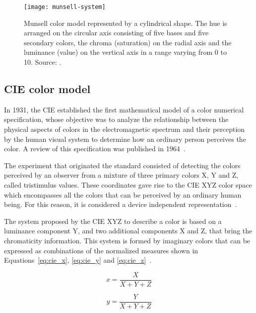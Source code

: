 \begin{figure}[!ht]
  \centering
  \texttt{[image: munsell-system]}
  \caption[Munsell color model.]{Munsell color model represented by a cylindrical shape. The hue is arranged on the circular axis consisting of five bases and five secondary colors, the chroma (saturation) on the radial axis and the luminance (value) on the vertical axis in a range varying from 0 to 10. Source: \citet{rus:07}.}
  \label{fig:munsell-system} 
\end{figure}

\subsection{CIE color model}
\label{sec:modelo_cores_cie}

In 1931, the CIE established the first mathematical model of a color numerical specification, whose objective was to analyze the relationship between the physical aspects of colors in the electromagnetic spectrum and their perception by the human visual system to determine how an ordinary person perceives the color. A review of this specification was published in 1964~\citep{gonzalez:02}.

The experiment that originated the standard consisted of detecting the colors perceived by an observer from a mixture of three primary colors X, Y and Z, called tristimulus values. These coordinates gave rise to the CIE XYZ color space which encompasses all the colors that can be perceived by an ordinary human being. For this reason, it is considered a device independent representation~\citep{konstantinos:00}.

The system proposed by the CIE XYZ to describe a color is based on a luminance component Y, and two additional components X and Z, that bring the chromaticity information. This system is formed by imaginary colors that can be expressed as combinations of the normalized measures shown in Equations~\ref{eq:cie_x}, \ref{eq:cie_y} and \ref{eq:cie_z}~\citep{konstantinos:00}.

\newpage
\begin{equation}
  x = \frac{X}{X + Y + Z}
\label{eq:cie_x}
\end{equation}

\begin{equation}
  y = \frac{Y}{X + Y + Z}
\label{eq:cie_y}
\end{equation}

